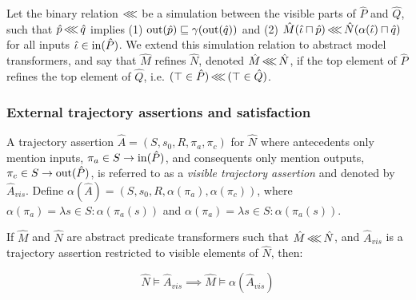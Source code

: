 Let the binary relation $\operatorname{\lll}$ be a simulation between the visible parts of $\hat P$ and $\hat Q$, such that $\hat p \operatorname{\lll} \hat q$ implies (1) $\operatorname{out}(\hat p) \sqsubseteq \gamma(\operatorname{out}(\hat q))$ and (2) $\hat M(\hat \iota \sqcap \hat p) \operatorname{\lll} \hat N(\alpha(\hat \iota) \sqcap \hat q)$ for all inputs $\hat \iota \in \operatorname{in}(\hat P)$. We extend this simulation relation to abstract model transformers, and say that $\hat M$ refines $\hat N$, denoted $\hat M \operatorname{\lll} \hat N$, if the top element of $\hat P$ refines the top element of $\hat Q$, i.e. $(\top \in \hat P) \operatorname{\lll} \, (\top \in \hat Q)$.


\subsubsection{External trajectory assertions and satisfaction}

A trajectory assertion $\hat A = (S, s_{0}, R, \pi_{a}, \pi_{c})$ for $\hat N$ where antecedents only mention inputs, $\pi_{a} \in S \rightarrow \operatorname{in}(\hat P)$, and consequents only mention outputs, $\pi_{c} \in S \rightarrow \operatorname{out}(\hat P)$, is referred to as a \textit{visible trajectory assertion} and denoted by $\hat A_{vis}$. Define $\alpha(\hat A) = (S, s_{0}, R, \alpha(\pi_{a}), \alpha(\pi_{c}))$, where $\alpha(\pi_{a}) = \lambda s \in S : \alpha(\pi_{a}(s))$ and $\alpha(\pi_{a}) = \lambda s \in S : \alpha(\pi_{a}(s))$.



\begin{theorem}
\label{thm:refinement}
If $\hat M$ and $\hat N$ are abstract predicate transformers such that $\hat M \operatorname{\lll} \hat N$, and $\hat A_{vis}$ is a trajectory assertion restricted to visible elements of $\hat N$, then:

\begin{equation*}
\hat N \models \hat A_{vis} \implies \hat M \models \alpha(\hat A_{vis})
\end{equation*}
\end{theorem}

